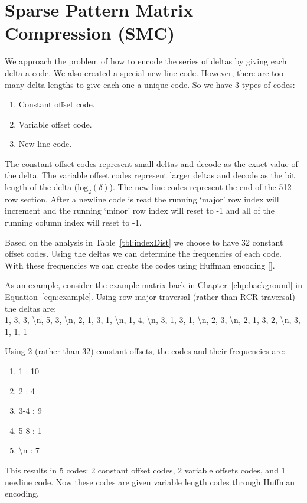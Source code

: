 \section{Sparse Pattern Matrix Compression (SMC)}
\label{sec:smc}
We approach the problem of how to encode the series of deltas by giving each delta a code. We also created a special new line code. However, there are too many delta lengths to give each one a unique code. So we have 3 types of codes:
\begin{enumerate}
    \item Constant offset code.
    \item Variable offset code.
    \item New line code.
\end{enumerate}

The constant offset codes represent small deltas and decode as the exact value of the delta. The variable offset codes represent larger deltas and decode as the bit length of the delta ($\textrm{log}_2(\delta)$). The new line codes represent the end of the 512 row section. After a newline code is read the running `major' row index will increment and the running `minor' row index will reset to -1 and all of the running column index will reset to -1.

Based on the analysis in Table~\ref{tbl:indexDist} we choose to have 32 constant offset codes. Using the deltas we can determine the frequencies of each code. With these frequencies we can create the codes using Huffman encoding [\cite{prelim:huffman}].

As an example, consider the example matrix back in Chapter~\ref{chp:background} in Equation~\ref{eqn:example}. Using row-major traversal (rather than RCR traversal) the deltas are:\\
1, 3, 3, \textbackslash n, 5, 3, \textbackslash n, 2, 1, 3, 1, \textbackslash n, 1, 4, \textbackslash n, 3, 1, 3, 1, \textbackslash n, 2, 3, \textbackslash n, 2, 1, 3, 2, \textbackslash n, 3, 1, 1, 1

Using 2 (rather than 32) constant offsets, the codes and their frequencies are:\\
\begin{enumerate}
    \item 1 : 10
    \item 2 : 4
    \item 3-4 : 9
    \item 5-8 : 1
    \item \textbackslash n : 7
\end{enumerate}
This results in 5 codes: 2 constant offset codes, 2 variable offsets codes, and 1 newline code. Now these codes are given variable length codes through Huffman encoding.

